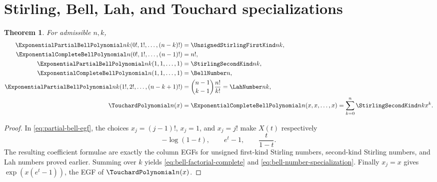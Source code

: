 \documentclass[11pt,a4paper,oneside,openany]{book}
\newtheorem{theorem}{Theorem}[chapter]
\theoremstyle{definition}
\theoremstyle{remark}
\begin{document}
\section{Stirling, Bell, Lah, and Touchard specializations}
\begin{theorem}\label{thm:bell-poly-specializations}
For admissible $n,k$,
\begin{align}
 \ExponentialPartialBellPolynomial nk(0!,1!,\ldots,(n-k)!)&=\UnsignedStirlingFirstKind nk,
 \label{eq:bell-first-specialization}\\
 \ExponentialCompleteBellPolynomial n(0!,1!,\ldots,(n-1)!)&=n!,
 \label{eq:bell-factorial-complete}\\
 \ExponentialPartialBellPolynomial nk(1,1,\ldots,1)&=\StirlingSecondKind nk,
 \label{eq:bell-second-specialization}\\
 \ExponentialCompleteBellPolynomial n(1,1,\ldots,1)&=\BellNumber n,
 \label{eq:bell-number-specialization}\\
 \ExponentialPartialBellPolynomial nk(1!,2!,\ldots,(n-k+1)!)
 &=\binom{n-1}{k-1}\frac{n!}{k!}=\LahNumber nk,
 \label{eq:bell-lah-specialization}\\
 \TouchardPolynomial n(x)&=\ExponentialCompleteBellPolynomial n(x,x,\ldots,x)
 =\sum_{k=0}^{n}\StirlingSecondKind nkx^k.
 \label{eq:touchard-bell-specialization}
\end{align}
\end{theorem}
\begin{proof}
In \eqref{eq:partial-bell-egf}, the choices $x_j=(j-1)!$, $x_j=1$, and
$x_j=j!$ make $X(t)$ respectively
\[
 -\log(1-t),\qquad e^t-1,\qquad \frac{t}{1-t}.
\]
The resulting coefficient formulae are exactly the column EGFs for unsigned
first-kind Stirling numbers, second-kind Stirling numbers, and Lah numbers proved
earlier.  Summing over $k$ yields \eqref{eq:bell-factorial-complete} and
\eqref{eq:bell-number-specialization}.  Finally $x_j=x$ gives
$\exp(x(e^t-1))$, the EGF of $\TouchardPolynomial n(x)$.
\end{proof}
\end{document}
